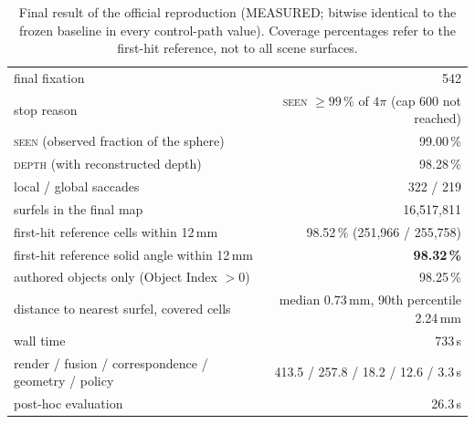 \documentclass[11pt,a4paper]{article}
\newcommand{\pct}[1]{#1\,\%}
\begin{document}
\begin{table}[h]
\centering\small
\caption{Final result of the official reproduction (MEASURED; bitwise identical to the frozen baseline in every
control-path value). Coverage percentages refer to the first-hit reference, not to all scene surfaces.}
\label{tab:results}
\begin{tabular}{@{}l r@{}}
\toprule
final fixation & 542 \\
stop reason & \textsc{seen} $\ge \pct{99}$ of $4\pi$ (cap 600 not reached) \\
\textsc{seen} (observed fraction of the sphere) & \pct{99.00} \\
\textsc{depth} (with reconstructed depth) & \pct{98.28} \\
local / global saccades & 322 / 219 \\
surfels in the final map & 16{,}517{,}811 \\
first-hit reference cells within 12\,mm & \pct{98.52} \;(251{,}966 / 255{,}758) \\
first-hit reference solid angle within 12\,mm & \textbf{\pct{98.32}} \\
\quad authored objects only (Object Index $>0$) & \pct{98.25} \\
distance to nearest surfel, covered cells & median 0.73\,mm, 90th percentile 2.24\,mm \\
wall time & 733\,s \\
\quad render / fusion / correspondence / geometry / policy & 413.5 / 257.8 / 18.2 / 12.6 / 3.3\,s \\
post-hoc evaluation & 26.3\,s \\
\bottomrule
\end{tabular}
\end{table}
\end{document}

